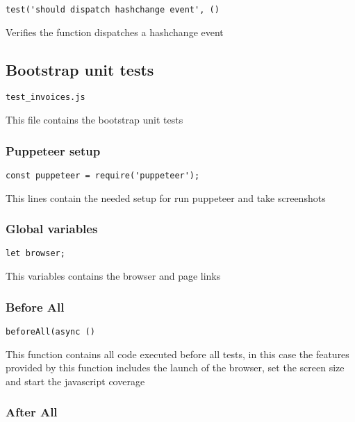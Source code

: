 \documentclass[a4paper]{article}
\begin{document}
\begin{lstlisting}
test('should dispatch hashchange event', ()
\end{lstlisting}

Verifies the function dispatches a hashchange event

\hypertarget{toc220}{}
\subsection{Bootstrap unit tests}

\begin{lstlisting}
test_invoices.js
\end{lstlisting}

This file contains the bootstrap unit tests

\hypertarget{toc221}{}
\subsubsection{Puppeteer setup}

\begin{lstlisting}
const puppeteer = require('puppeteer');
\end{lstlisting}

This lines contain the needed setup for run puppeteer and take screenshots

\hypertarget{toc222}{}
\subsubsection{Global variables}

\begin{lstlisting}
let browser;
\end{lstlisting}

This variables contains the browser and page links

\hypertarget{toc223}{}
\subsubsection{Before All}

\begin{lstlisting}
beforeAll(async ()
\end{lstlisting}

This function contains all code executed before all tests, in this case the
features provided by this function includes the launch of the browser, set
the screen size and start the javascript coverage

\hypertarget{toc224}{}
\subsubsection{After All}
\end{document}
